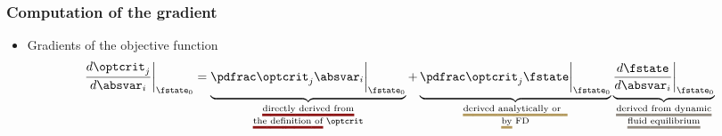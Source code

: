 \begin{frame}
  \frametitle{Computation of the gradient}
  
  \begin{itemize}  
    \item Gradients of the objective function
			\begin{align*}\label{eq:sensitivity_startingpoint}
			\DoptcritJBYabsvarI\bigg\rvert_{\fstate_0}=\setulcolor{primary_0}\setul{}{2pt}
			\underbrace{\PoptcritJBYabsvarI\bigg\rvert_{\fstate_0}}_{
			                                                        \substack{
			                                                                 \text{\ul{directly derived from}} \\
			                                                                 \text{\ul{the definition of} $\optcrit$}
			                                                                 } 
			                                                        }  +
			\underbrace{\PoptcritJBYfstate\bigg\rvert_{\fstate_0}}_ {\setulcolor{neutral_1}
			                                                        \substack{
			                                                                 \text{\ul{derived analytically or~~}}\\
			                                                                 \text{\ul{by} FD}
			                                                                 }
			                                                        }
			\underbrace{\DfstateBYabsvarI\bigg\rvert_{\fstate_0}}_  {\setulcolor{neutral_2}
			                                                        \substack{
			                                                                 \text{\ul{derived from dynamic}}\\
			                                                                 \text{\ul{fluid equilibrium}}
			                                                                 }
			                                                        }
			\end{align*}
%

\end{itemize}
\end{frame}
